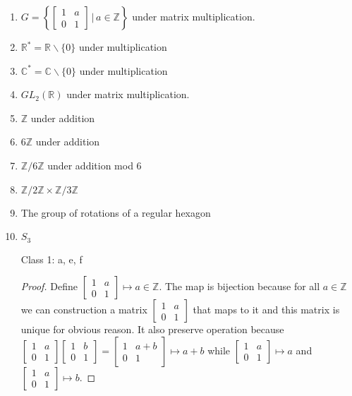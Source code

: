 \documentclass[11pt, oneside]{article}
\newcommand{\Z}{\mathbb Z}
\newcommand{\C}{\mathbb C}
\newcommand{\R}{\mathbb R}
\begin{document}
\begin{enumerate}
\begin{enumerate}
\item $G=\left\{ \begin{bmatrix} 1 & a\\ 0 & 1\end{bmatrix} \, \bigg| \, a\in \Z\right\}$ under matrix multiplication.
\item $\R^* = \R\backslash\{0\}$ under multiplication
\item $\C^* = \C\backslash\{0\}$ under multiplication
\item $GL_2(\R)$ under matrix multiplication.
\item $\Z$ under addition
\item $6\Z$ under addition
\item $\Z/6\Z$ under addition mod 6
\item $\Z/2\Z \times \Z/3\Z$
\item The group of rotations of a regular hexagon 
\item $S_3$

\end{enumerate}
\begin{enumerate}
    \item[Class 1:] a, e, f
    \begin{proof}
    Define $\begin{bmatrix} 1 & a\\ 0 & 1\end{bmatrix}\mapsto a\in \Z$. The map is bijection because for all $a\in \Z$ we can construction a matrix $\begin{bmatrix} 1 & a\\ 0 & 1\end{bmatrix}$ that maps to it and this matrix is unique for obvious reason. It also preserve operation because $\begin{bmatrix} 1 & a\\ 0 & 1\end{bmatrix}\begin{bmatrix} 1 & b\\ 0 & 1\end{bmatrix}=\begin{bmatrix} 1 & a+b\\ 0 & 1\end{bmatrix} \mapsto a+b $ while $\begin{bmatrix} 1 & a\\ 0 & 1\end{bmatrix}\mapsto a$ and $\begin{bmatrix} 1 & a\\ 0 & 1\end{bmatrix}\mapsto b$. 
    

\end{proof}
\end{enumerate}
\end{enumerate}
\end{document}
